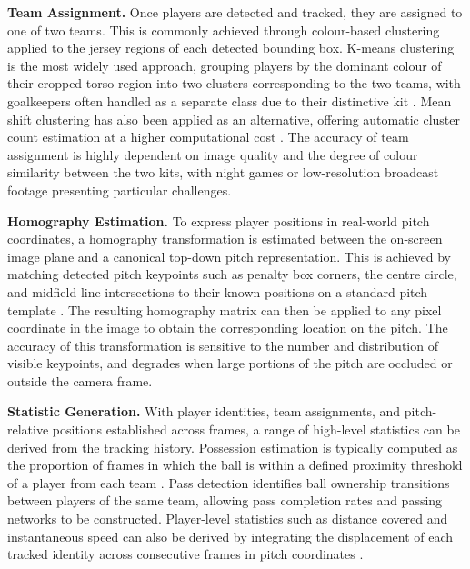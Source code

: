 \textbf{Team Assignment.} Once players are detected and tracked, they are assigned to one of two teams. This is commonly achieved through colour-based clustering applied to the jersey regions of each detected bounding box. K-means clustering is the most widely used approach, grouping players by the dominant colour of their cropped torso region into two clusters corresponding to the two teams, with goalkeepers often handled as a separate class due to their distinctive kit \cite{ZhengLiu2012ColorRecognition}. Mean shift clustering has also been applied as an alternative, offering automatic cluster count estimation at a higher computational cost \cite{ZhengLiu2012ColorRecognition}. The accuracy of team assignment is highly dependent on image quality and the degree of colour similarity between the two kits, with night games or low-resolution broadcast footage presenting particular challenges.

\textbf{Homography Estimation.} To express player positions in real-world pitch coordinates, a homography transformation is estimated between the on-screen image plane and a canonical top-down pitch representation. This is achieved by matching detected pitch keypoints such as penalty box corners, the centre circle, and midfield line intersections to their known positions on a standard pitch template \cite{dubrofsky2009homography}. The resulting homography matrix can then be applied to any pixel coordinate in the image to obtain the corresponding location on the pitch. The accuracy of this transformation is sensitive to the number and distribution of visible keypoints, and degrades when large portions of the pitch are occluded or outside the camera frame.

\textbf{Statistic Generation.} With player identities, team assignments, and pitch-relative positions established across frames, a range of high-level statistics can be derived from the tracking history. Possession estimation is typically computed as the proportion of frames in which the ball is within a defined proximity threshold of a player from each team \cite{mradovic38_football_analysis_repo,hmzbo_football_analytics_dl_cv_repo}. Pass detection identifies ball ownership transitions between players of the same team, allowing pass completion rates and passing networks to be constructed. Player-level statistics such as distance covered and instantaneous speed can also be derived by integrating the displacement of each tracked identity across consecutive frames in pitch coordinates \cite{mradovic38_football_analysis_repo,hmzbo_football_analytics_dl_cv_repo}.

